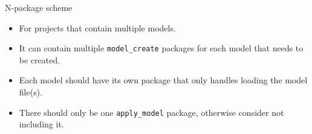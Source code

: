 \documentclass[10pt]{beamer}
\begin{document}
\begin{frame}[fragile]{N-package scheme}

  \begin{itemize}
    \item For projects that contain multiple models.

    \item It can contain multiple \texttt{model\_create} packages for each model that needs to be created.

    \item Each model should have its own package that only handles loading the model file(s).

    \item There should only be one \texttt{apply\_model} package, otherwise consider not including it.
  \end{itemize}

\end{frame}






\end{document}
